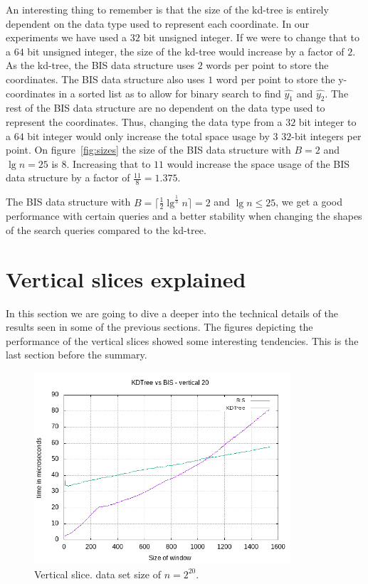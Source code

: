 An interesting thing to remember is that the size of the kd-tree is entirely dependent on the data type used to represent each coordinate. In our experiments we have used a $32$ bit unsigned integer. If we were to change that to a $64$ bit unsigned integer, the size of the kd-tree would increase by a factor of $2$. As the kd-tree, the BIS data structure uses $2$ words per point to store the coordinates. The BIS data structure also uses $1$ word per point to store the y-coordinates in a sorted list as to allow for binary search to find $\hat{y_1}$ and $\hat{y_2}$. The rest of the BIS data structure are no dependent on the data type used to represent the coordinates. Thus, changing the data type from a $32$ bit integer to a $64$ bit integer would only increase the total space usage by $3$ $32$-bit integers per point. On figure~\ref{fig:sizes} the size of the BIS data structure with $B=2$ and $\lg n = 25$ is $8$. Increasing that to $11$ would increase the space usage of the BIS data structure by a factor of $\frac{11}{8} = 1.375$.

The BIS data structure with $B = \lceil \frac{1}{2}\lg^{\frac{1}{3}} n \rceil = 2$ and $\lg n \leq 25$, we get a good performance with certain queries and a better stability when changing the shapes of the search queries compared to the kd-tree. 


\section{Vertical slices explained}
\label{sect:verthoriexp}

In this section we are going to dive a deeper into the technical details of the results seen in some of the previous sections. The figures depicting the performance of the vertical slices showed some interesting tendencies. This is the last section before the summary.

\begin{figure}[h]
    \centering
    \includegraphics[width = 0.85\textwidth]{pictures/analysis/vert_20.png}
    \caption{Vertical slice. data set size of $n=2^{20}$.}\label{fig:vert_20}
\end{figure}


